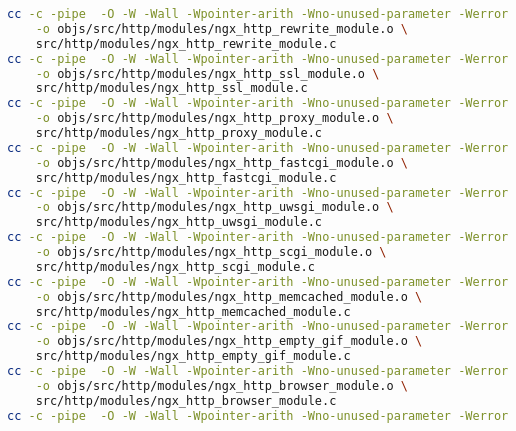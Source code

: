 \begin{lstlisting}[language=bash]
cc -c -pipe  -O -W -Wall -Wpointer-arith -Wno-unused-parameter -Werror -g  -I src/core -I src/event -I src/event/modules -I src/os/unix -I objs -I src/http -I src/http/modules \
	-o objs/src/http/modules/ngx_http_rewrite_module.o \
	src/http/modules/ngx_http_rewrite_module.c
cc -c -pipe  -O -W -Wall -Wpointer-arith -Wno-unused-parameter -Werror -g  -I src/core -I src/event -I src/event/modules -I src/os/unix -I objs -I src/http -I src/http/modules \
	-o objs/src/http/modules/ngx_http_ssl_module.o \
	src/http/modules/ngx_http_ssl_module.c
cc -c -pipe  -O -W -Wall -Wpointer-arith -Wno-unused-parameter -Werror -g  -I src/core -I src/event -I src/event/modules -I src/os/unix -I objs -I src/http -I src/http/modules \
	-o objs/src/http/modules/ngx_http_proxy_module.o \
	src/http/modules/ngx_http_proxy_module.c
cc -c -pipe  -O -W -Wall -Wpointer-arith -Wno-unused-parameter -Werror -g  -I src/core -I src/event -I src/event/modules -I src/os/unix -I objs -I src/http -I src/http/modules \
	-o objs/src/http/modules/ngx_http_fastcgi_module.o \
	src/http/modules/ngx_http_fastcgi_module.c
cc -c -pipe  -O -W -Wall -Wpointer-arith -Wno-unused-parameter -Werror -g  -I src/core -I src/event -I src/event/modules -I src/os/unix -I objs -I src/http -I src/http/modules \
	-o objs/src/http/modules/ngx_http_uwsgi_module.o \
	src/http/modules/ngx_http_uwsgi_module.c
cc -c -pipe  -O -W -Wall -Wpointer-arith -Wno-unused-parameter -Werror -g  -I src/core -I src/event -I src/event/modules -I src/os/unix -I objs -I src/http -I src/http/modules \
	-o objs/src/http/modules/ngx_http_scgi_module.o \
	src/http/modules/ngx_http_scgi_module.c
cc -c -pipe  -O -W -Wall -Wpointer-arith -Wno-unused-parameter -Werror -g  -I src/core -I src/event -I src/event/modules -I src/os/unix -I objs -I src/http -I src/http/modules \
	-o objs/src/http/modules/ngx_http_memcached_module.o \
	src/http/modules/ngx_http_memcached_module.c
cc -c -pipe  -O -W -Wall -Wpointer-arith -Wno-unused-parameter -Werror -g  -I src/core -I src/event -I src/event/modules -I src/os/unix -I objs -I src/http -I src/http/modules \
	-o objs/src/http/modules/ngx_http_empty_gif_module.o \
	src/http/modules/ngx_http_empty_gif_module.c
cc -c -pipe  -O -W -Wall -Wpointer-arith -Wno-unused-parameter -Werror -g  -I src/core -I src/event -I src/event/modules -I src/os/unix -I objs -I src/http -I src/http/modules \
	-o objs/src/http/modules/ngx_http_browser_module.o \
	src/http/modules/ngx_http_browser_module.c
cc -c -pipe  -O -W -Wall -Wpointer-arith -Wno-unused-parameter -Werror -g  -I src/core -I src/event -I src/event/modules -I src/os/unix -I objs -I src/http -I src/http/modules \

\end{lstlisting}
